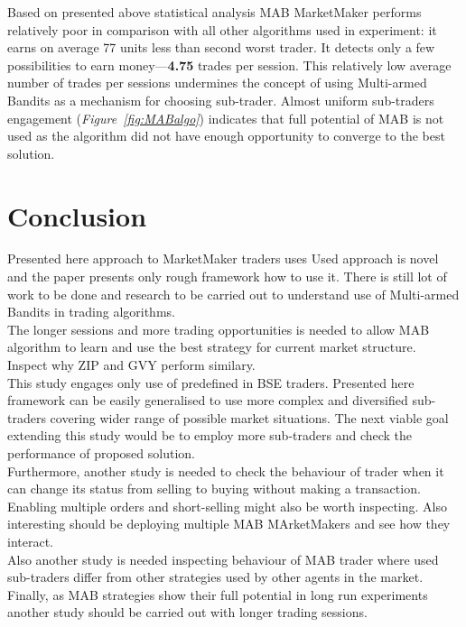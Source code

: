 \documentclass{llncs}
\begin{document}
Based on presented above statistical analysis MAB MarketMaker performs relatively poor in comparison with all other algorithms used in experiment: it earns on average 77 units less than second worst trader. It detects only a few possibilities to earn money---\textbf{4.75} trades per session. This relatively low average number of trades per sessions undermines the concept of using Multi-armed Bandits as a mechanism for choosing sub-trader. Almost uniform sub-traders engagement (\emph{Figure~\ref{fig:MABalgo}}) indicates that full potential of MAB is not used as the algorithm did not have enough opportunity to converge to the best solution.


\section{Conclusion}
Presented here approach to MarketMaker traders uses 
Used approach is novel and the paper presents only rough framework how to use it. There is still lot of work to be done and research to be carried out to understand use of Multi-armed Bandits in trading algorithms.\\

The longer sessions and more trading opportunities is needed to allow MAB algorithm to learn and use the best strategy for current market structure.\\

Inspect why ZIP and GVY perform similary.\\

This study engages only use of predefined in BSE traders. Presented here framework can be easily generalised to use more complex and diversified sub-traders covering wider range of possible market situations. The next viable goal extending this study would be to employ more sub-traders and check the performance of proposed solution.\\
Furthermore, another study is needed to check the behaviour of trader when it can change its status from selling to buying without making a transaction. Enabling multiple orders and short-selling might also be worth inspecting. Also interesting should be deploying multiple MAB MArketMakers and see how they interact.\\
Also another study is needed inspecting behaviour of MAB trader where used sub-traders differ from other strategies used by other agents in the market.\\
Finally, as MAB strategies show their full potential in long run experiments another study should be carried out with longer trading sessions.
\end{document}
